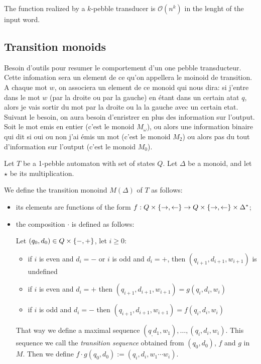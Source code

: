 \begin{proposition}
The function realized by a $k$-pebble transducer is $\mathcal{O}(n^k)$ in the lenght of the input word.
\end{proposition}

\subsection{Transition monoids}

Besoin d'outils pour resumer le comportement d'un one pebble transducteur.
Cette infomation sera un element de ce qu'on appellera le moinoid de transition. A chaque mot $w$, on associera un element de ce monoid qui nous dira: si j'entre dans le mot $w$ (par la droite ou par la gauche) en étant dans un certain atat $q$, alors je vais sortir du mot par la droite ou la  la gauche avec un certain etat. Suivant le besoin, on aura besoin d'enristrer en plus des information sur l'output. Soit le mot emis en entier (c'est le monoid $M_\omega$), ou alors une information binaire qui dit si oui ou non j'ai émis un mot (c'est le monoid $M_2$) ou alors pas du tout d'information sur l'output (c'est le monoid $M_0$).

   
\begin{definition}%
Let $T$ be a 1-pebble automaton with set of states $Q$. Let $\Delta$ be a monoid, and let $\star$ be its multiplication.

We define the transition monoind $M(\Delta)$ of $T$ as follows:
\begin{itemize}
\item its elements are functions of the form $f:Q\times\{\rightarrow,\leftarrow\}\to Q\times\{\rightarrow,\leftarrow\}\times \Delta^*$;
\item the composition $\cdot$ is defined as follows:

Let $(q_0,d_0)\in Q\times \{{-},{+}\}$, let $i\geq 0$:
\begin{itemize}
\item if $i$ is even and $d_i={-}$ or $i$ is odd and $d_i={+}$, then $(q_{i+1},d_{i+1},w_{i+1})$ is undefined
\item if $i$ is even and $d_i={+}$ then $(q_{i+1},d_{i+1},w_{i+1})=g(q_i,d_i,w_i)$
\item if $i$ is odd and $d_i={-}$ then $(q_{i+1},d_{i+1},w_{i+1})=f(q_i,d_i,w_i)$
\end{itemize}
That way we define a maximal sequence $(q_,d_1,w_1),\ldots,(q_i,d_i,w_i)$.
This sequence we call the \emph{transition sequence} obtained from $(q_0,d_0)$, $f$ and $g$ in $M$.
Then we define $f\cdot g(q_0,d_0):=(q_i,d_i,w_1\cdots w_i)$.
\end{itemize}
\end{definition}

